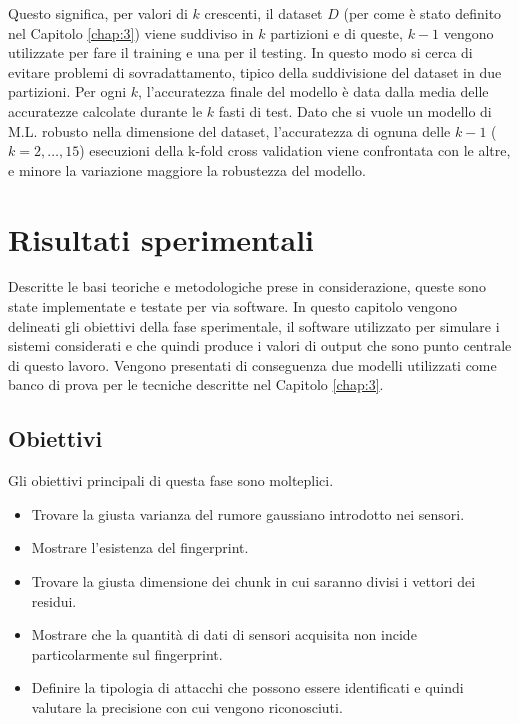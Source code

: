 \documentclass[Lau,binding=0.6cm,noexaminfo]{sapthesis}
\begin{document}
Questo significa, per valori di $k$ crescenti, il dataset $D$ (per come \`e stato definito nel Capitolo \ref{chap:3}) viene suddiviso in $k$ partizioni e di queste, $k-1$ vengono utilizzate per fare il training e una per il testing.
In questo modo si cerca di evitare problemi di sovradattamento, tipico della suddivisione del dataset in due partizioni.
Per ogni $k$, l'accuratezza finale del modello \`e data dalla media delle accuratezze calcolate durante le $k$ fasti di test.
Dato che si vuole un modello di M.L. robusto nella dimensione del dataset, l'accuratezza di ognuna delle $k-1$ ($k = 2,\ldots,15$) esecuzioni della k-fold cross validation viene confrontata con le altre, e minore la variazione maggiore la robustezza del modello.


\chapter{Risultati sperimentali}\label{chap:5}
Descritte le basi teoriche e metodologiche prese in considerazione, queste sono state implementate e testate per via software.
In questo capitolo vengono delineati gli obiettivi della fase sperimentale, il software utilizzato per simulare i sistemi considerati e che quindi produce i valori di output 
che sono punto centrale di questo lavoro. Vengono presentati di conseguenza due modelli utilizzati come banco di prova per le tecniche descritte nel Capitolo \ref{chap:3}.

\section{Obiettivi}\label{sec:1}
Gli obiettivi principali di questa fase sono molteplici.
\begin{itemize}
    \item Trovare la giusta varianza del rumore gaussiano introdotto nei sensori.
    \item Mostrare l'esistenza del fingerprint.
    \item Trovare la giusta dimensione dei chunk in cui saranno divisi i vettori dei residui.
    \item Mostrare che la quantit\`a di dati di sensori acquisita non incide particolarmente sul fingerprint.
    \item Definire la tipologia di attacchi che possono essere identificati e quindi valutare la precisione con cui vengono riconosciuti.
 \end{itemize}
\end{document}
